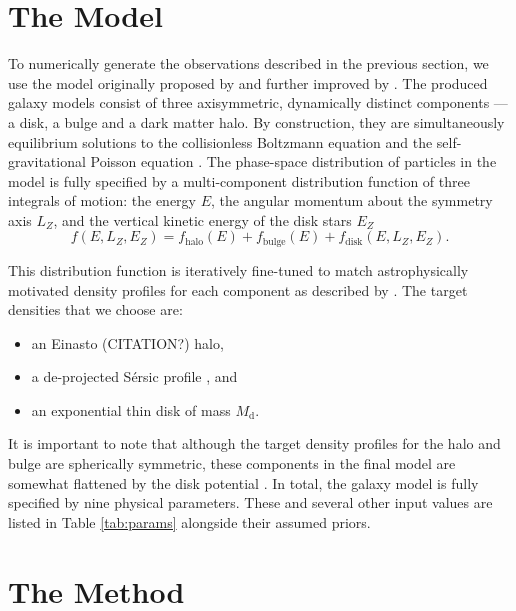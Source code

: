 \documentclass[preprint]{aastex}
\newcommand{\tab}[1]{Table \ref{tab:#1}}
\newcommand{\eqlabel}[1]{\label{eq:#1}}
\newcommand{\df}{f}
\newcommand{\dfs}[1]{\df_\mathrm{#1}}
\newcommand{\dfhalo}{\dfs{halo}}
\newcommand{\dfbulge}{\dfs{bulge}}
\newcommand{\dfdisk}{\dfs{disk}}
\newcommand{\E}{\ensuremath{E}}
\newcommand{\Lz}{\ensuremath{L_Z}}
\newcommand{\Ez}{\ensuremath{E_Z}}
\newcommand{\disk}{\mathrm{d}}
\newcommand{\mass}{\ensuremath{M}}
\newcommand{\Md}{\ensuremath{\mass_\disk}}
\begin{document}
\section{The Model}

To numerically generate the observations described in the previous section, we
use the model originally proposed by \citet{Kuijken:1995} and further improved
by \citet{Widrow:2008}.  The produced galaxy models consist of three axisymmetric,
dynamically distinct components --- a disk, a bulge and a dark matter halo.
By construction, they are simultaneously equilibrium solutions to the collisionless
Boltzmann equation and the self-gravitational Poisson equation \citep{Binney:2008}.
The phase-space distribution of particles in the model is fully specified by a
multi-component distribution function of three integrals of motion: the energy
\E, the angular momentum about the symmetry axis \Lz, and the vertical kinetic
energy of the disk stars \Ez
\begin{equation}
    \eqlabel{df1}
    \df (\E,\Lz,\Ez) = \dfhalo (\E) + \dfbulge (\E) + \dfdisk (\E,\Lz,\Ez).
\end{equation}

This distribution function is iteratively fine-tuned to match astrophysically
motivated density profiles for each component as described by \citet{Widrow:2008}.
The target densities that we choose are:
\begin{itemize}
    \item{an Einasto (CITATION?) halo,}
    \item{a de-projected S\'ersic profile \citep{Prugniel:1997,Terzic:2005}, and}
    \item{an exponential thin disk of mass \Md.}
\end{itemize}
It is important to note that although the target density profiles for the halo
and bulge are spherically symmetric, these components in the final model are
somewhat flattened by the disk potential \citep{Widrow:2008}.  In total, the
galaxy model is fully specified by nine physical parameters.  These and several
other input values are listed in \tab{params} alongside their assumed priors.




\section{The Method}
\end{document}
